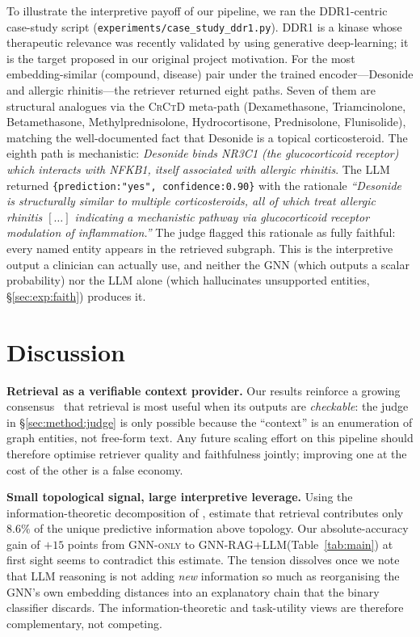 \documentclass{article}
\newcommand{\ours}{\textsc{GNN-RAG+LLM}\xspace}
\newcommand{\gnno}{\textsc{GNN-only}\xspace}
\begin{document}
To illustrate the interpretive payoff of our pipeline, we ran the DDR1-centric case-study script (\texttt{experiments/case\_study\_ddr1.py}). DDR1 is a kinase whose therapeutic relevance was recently validated by \citet{zhavoronkov2019ddr1} using generative deep-learning; it is the target proposed in our original project motivation. For the most embedding-similar (compound, disease) pair under the trained encoder---Desonide and allergic rhinitis---the retriever returned eight paths. Seven of them are structural analogues via the \textsc{CrCtD} meta-path (Dexamethasone, Triamcinolone, Betamethasone, Methylprednisolone, Hydrocortisone, Prednisolone, Flunisolide), matching the well-documented fact that Desonide is a topical corticosteroid. The eighth path is mechanistic: \emph{Desonide binds NR3C1 (the glucocorticoid receptor) which interacts with NFKB1, itself associated with allergic rhinitis}. The LLM returned \texttt{\{prediction:"yes", confidence:0.90\}} with the rationale \emph{``Desonide is structurally similar to multiple corticosteroids, all of which treat allergic rhinitis $[\ldots]$ indicating a mechanistic pathway via glucocorticoid receptor modulation of inflammation.''} The judge flagged this rationale as fully faithful: every named entity appears in the retrieved subgraph. This is the interpretive output a clinician can actually use, and neither the GNN (which outputs a scalar probability) nor the LLM alone (which hallucinates unsupported entities, \S\ref{sec:exp:faith}) produces it.

\section{Discussion}
\label{sec:disc}

\textbf{Retrieval as a verifiable context provider.} Our results reinforce a growing consensus~\citep{lewis2020rag,mavromatis2024gnnrag} that retrieval is most useful when its outputs are \emph{checkable}: the judge in \S\ref{sec:method:judge} is only possible because the ``context'' is an enumeration of graph entities, not free-form text. Any future scaling effort on this pipeline should therefore optimise retriever quality and faithfulness jointly; improving one at the cost of the other is a false economy.

\textbf{Small topological signal, large interpretive leverage.} Using the information-theoretic decomposition of \citet{bertschinger2014unique}, \citet{hays2026raggnn} estimate that retrieval contributes only $8.6\%$ of the unique predictive information above topology. Our absolute-accuracy gain of $+15$ points from \gnno to \ours (Table~\ref{tab:main}) at first sight seems to contradict this estimate. The tension dissolves once we note that LLM reasoning is not adding \emph{new} information so much as reorganising the GNN's own embedding distances into an explanatory chain that the binary classifier discards. The information-theoretic and task-utility views are therefore complementary, not competing.
\end{document}
